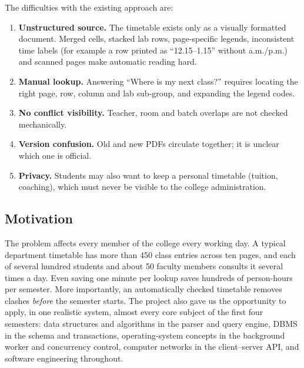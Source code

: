 The difficulties with the existing approach are:
\begin{enumerate}
\item \textbf{Unstructured source.} The timetable exists only as a visually formatted document.
      Merged cells, stacked lab rows, page-specific legends, inconsistent time labels (for example a
      row printed as ``12.15--1.15'' without a.m./p.m.) and scanned pages make automatic reading hard.
\item \textbf{Manual lookup.} Answering ``Where is my next class?'' requires locating the right
      page, row, column and lab sub-group, and expanding the legend codes.
\item \textbf{No conflict visibility.} Teacher, room and batch overlaps are not checked mechanically.
\item \textbf{Version confusion.} Old and new PDFs circulate together; it is unclear which one is
      official.
\item \textbf{Privacy.} Students may also want to keep a personal timetable (tuition, coaching),
      which must never be visible to the college administration.
\end{enumerate}

\subsection{Motivation}
The problem affects every member of the college every working day. A typical department timetable
has more than 450 class entries across ten pages, and each of several hundred students and about 50 faculty
members consults it several times a day. Even saving one minute per lookup saves hundreds of
person-hours per semester. More importantly, an automatically checked timetable removes clashes
\emph{before} the semester starts. The project also gave us the opportunity to apply, in one
realistic system, almost every core subject of the first four semesters: data structures and
algorithms in the parser and query engine, DBMS in the schema and transactions, operating-system
concepts in the background worker and concurrency control, computer networks in the client--server
API, and software engineering throughout.

